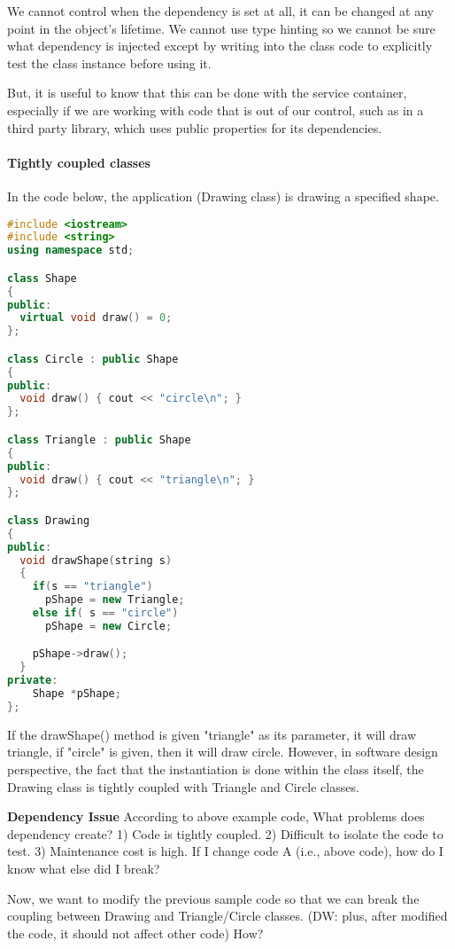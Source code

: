 \documentclass{book}
\begin{document}
        We cannot control when the dependency is set at all, it can be changed at any point in the object's lifetime.
We cannot use type hinting so we cannot be sure what dependency is injected except by writing into the class code to explicitly test the class instance before using it.

    But, it is useful to know that this can be done with the service container, especially if we are working with code that is out of our control,
    such as in a third party library, which uses public properties for its dependencies.
\paragraph{Tightly coupled classes}
In the code below, the application (Drawing class) is drawing a specified shape.
\begin{lstlisting}[caption={Dependency Injection example code}, language=C++]
#include <iostream>
#include <string>
using namespace std;

class Shape
{
public:
  virtual void draw() = 0;
};

class Circle : public Shape
{
public:
  void draw() { cout << "circle\n"; }
};

class Triangle : public Shape
{
public:
  void draw() { cout << "triangle\n"; }
};

class Drawing
{
public:
  void drawShape(string s)
  {
    if(s == "triangle")
      pShape = new Triangle;
    else if( s == "circle")
      pShape = new Circle;

    pShape->draw();
  }
private:
    Shape *pShape;
};
\end{lstlisting}
If the drawShape() method is given "triangle" as its parameter, it will draw triangle, if "circle" is given, then it will draw circle. 
However, in software design perspective, the fact that the instantiation is done within the class itself, the Drawing class is tightly coupled with Triangle and Circle classes.

\textbf{Dependency Issue}
According to above example code, What problems does dependency create? 1)   Code is tightly coupled. 2) Difficult to isolate the code to test.
3)    Maintenance cost is high.  If I change code A (i.e., above code), how do I know what else did I break?

Now, we want to modify the previous sample code so that we can break the coupling between Drawing and Triangle/Circle classes.
(DW: plus, after modified the code, it should not affect other code) How?
\end{document}
